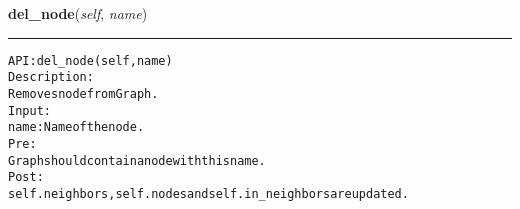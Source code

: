     \label{coinor:gimpy:graph:Graph:del_node}

    \vspace{0.5ex}

\hspace{.8\funcindent}\begin{boxedminipage}{\funcwidth}

    \raggedright \textbf{del\_node}(\textit{self}, \textit{name})

    \vspace{-1.5ex}

    \rule{\textwidth}{0.5\fboxrule}
\setlength{\parskip}{2ex}
\begin{alltt}

API: del\_node(self, name)
Description:
Removes node from Graph.
Input:
    name: Name of the node.
Pre:
    Graph should contain a node with this name.
Post:
    self.neighbors, self.nodes and self.in\_neighbors are updated.
\end{alltt}

\setlength{\parskip}{1ex}
    \end{boxedminipage}

    \label{coinor:gimpy:graph:Graph:dfs}

    \vspace{0.5ex}

